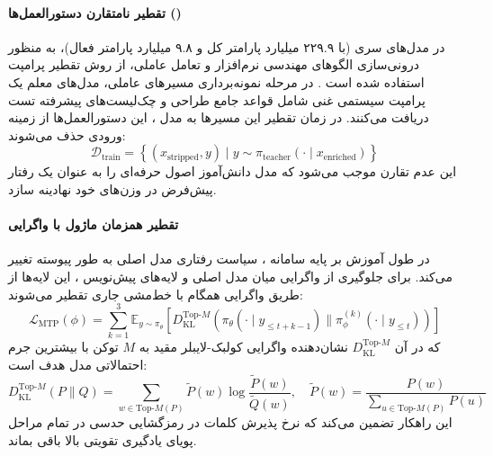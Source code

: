 \item {}

\paragraph*{تقطیر نامتقارن دستورالعمل‌ها ()}
در مدل‌های سری  (با ۲۲۹.۹ میلیارد پارامتر کل و ۹.۸ میلیارد پارامتر فعال)، به منظور درونی‌سازی الگوهای مهندسی نرم‌افزار و تعامل عاملی، از روش تقطیر پرامپت استفاده شده است \cite{minimax2026m2}. در مرحله نمونه‌برداری مسیرهای عاملی، مدل‌های معلم یک پرامپت سیستمی غنی شامل قواعد جامع طراحی  و چک‌لیست‌های پیشرفته تست دریافت می‌کنند. در زمان تقطیر این مسیرها به مدل ، این دستورالعمل‌ها از زمینه ورودی حذف می‌شوند:
\begin{equation}
    \mathcal{D}_{\text{train}} = \left\{ (x_{\text{stripped}}, y) \mid y \sim \pi_{\text{teacher}}(\cdot \mid x_{\text{enriched}}) \right\}
\end{equation}
این عدم تقارن موجب می‌شود که مدل دانش‌آموز اصول حرفه‌ای را به عنوان یک رفتار پیش‌فرض در وزن‌های خود نهادینه سازد.

\paragraph*{تقطیر همزمان ماژول  با واگرایی }
در طول آموزش  بر پایه سامانه ، سیاست رفتاری مدل اصلی به طور پیوسته تغییر می‌کند. برای جلوگیری از واگرایی میان مدل اصلی و لایه‌های پیش‌نویس ، این لایه‌ها از طریق واگرایی  همگام با خط‌مشی جاری تقطیر می‌شوند:
\begin{equation}
    \mathcal{L}_{\mathrm{MTP}}(\phi) = \sum_{k=1}^3 \mathbb{E}_{y \sim \pi_\theta} \left[ D_{\mathrm{KL}}^{\mathrm{Top\text{-}}M}\left( \pi_\theta(\cdot \mid y_{\le t+k-1}) \parallel \pi_\phi^{(k)}(\cdot \mid y_{\le t}) \right) \right]
\end{equation}
که در آن $D_{\mathrm{KL}}^{\mathrm{Top\text{-}}M}$ نشان‌دهنده واگرایی کولبک-لایبلر مقید به $M$ توکن با بیشترین جرم احتمالاتی مدل هدف است:
\begin{equation}
    D_{\mathrm{KL}}^{\mathrm{Top\text{-}}M}(P \parallel Q) = \sum_{w \in \mathrm{Top\text{-}}M(P)} \tilde{P}(w) \log \frac{\tilde{P}(w)}{\tilde{Q}(w)}, \quad \tilde{P}(w) = \frac{P(w)}{\sum_{u \in \mathrm{Top\text{-}}M(P)} P(u)}
\end{equation}
این راهکار تضمین می‌کند که نرخ پذیرش کلمات در رمزگشایی حدسی در تمام مراحل پویای یادگیری تقویتی بالا باقی بماند.

